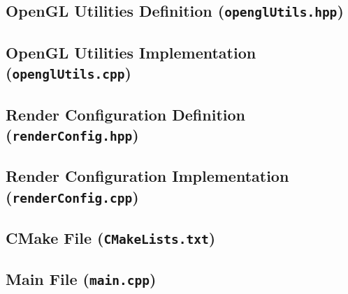 \pagebreak

\subsection{OpenGL Utilities Definition (\texttt{openglUtils.hpp})}


\subsection{OpenGL Utilities Implementation (\texttt{openglUtils.cpp})}



\pagebreak

\subsection{Render Configuration Definition (\texttt{renderConfig.hpp})}


\subsection{Render Configuration Implementation (\texttt{renderConfig.cpp})}



\pagebreak

\subsection{CMake File (\texttt{CMakeLists.txt})}


\subsection{Main File (\texttt{main.cpp})}

